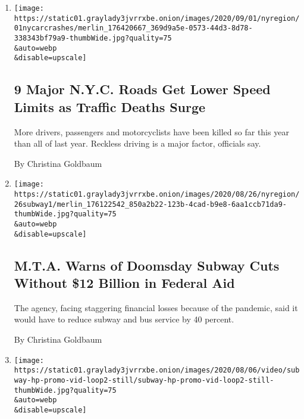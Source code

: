 \begin{enumerate}
\def\labelenumi{\arabic{enumi}.}
\item
  \href{/2020/09/01/nyregion/nyc-traffic-deaths-coronavirus.html}{}

  \texttt{[image: https://static01.graylady3jvrrxbe.onion/images/2020/09/01/nyregion/01nycarcrashes/merlin\_176420667\_369d9a5e-0573-44d3-8d78-338343bf79a9-thumbWide.jpg?quality=75\\\&auto=webp\\\&disable=upscale]}

  \hypertarget{9-major-nyc-roads-get-lower-speed-limits-as-traffic-deaths-surge}{%
  \subsection{9 Major N.Y.C. Roads Get Lower Speed Limits as Traffic
  Deaths
  Surge}\label{9-major-nyc-roads-get-lower-speed-limits-as-traffic-deaths-surge}}

  More drivers, passengers and motorcyclists have been killed so far
  this year than all of last year. Reckless driving is a major factor,
  officials say.

  By Christina Goldbaum
\item
  \href{/2020/08/26/nyregion/nyc-subway-bus-service-cuts.html}{}

  \texttt{[image: https://static01.graylady3jvrrxbe.onion/images/2020/08/26/nyregion/26subway1/merlin\_176122542\_850a2b22-123b-4cad-b9e8-6aa1ccb71da9-thumbWide.jpg?quality=75\\\&auto=webp\\\&disable=upscale]}

  \hypertarget{mta-warns-of-doomsday-subway-cuts-without-12-billion-in-federal-aid}{%
  \subsection{M.T.A. Warns of Doomsday Subway Cuts Without \$12 Billion
  in Federal
  Aid}\label{mta-warns-of-doomsday-subway-cuts-without-12-billion-in-federal-aid}}

  The agency, facing staggering financial losses because of the
  pandemic, said it would have to reduce subway and bus service by 40
  percent.

  By Christina Goldbaum
\item
  \href{/interactive/2020/08/10/nyregion/nyc-subway-coronavirus.html}{}

  \texttt{[image: https://static01.graylady3jvrrxbe.onion/images/2020/08/06/video/subway-hp-promo-vid-loop2-still/subway-hp-promo-vid-loop2-still-thumbWide.jpg?quality=75\\\&auto=webp\\\&disable=upscale]}


\end{enumerate}

